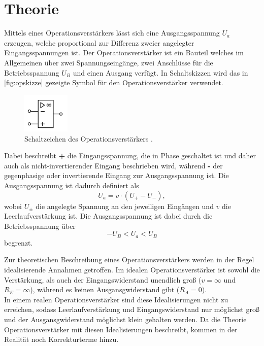 \section{Theorie}
\label{sec:theorie}
Mittels eines Operationsverstärkers lässt sich eine Ausgangsspannung $U_a$ erzeugen, welche 
proportional zur Differenz zweier angelegter Eingangsspannungen ist. 
Der Operationsverstärker ist ein Bauteil welches im Allgemeinen über zwei Spannungseingänge, zwei Anschlüsse 
für die Betriebsspannung $U_B$ und einen Ausgang 
verfügt. In Schaltskizzen wird 
das in \autoref{fig:opskizze} gezeigte Symbol für den Operationsverstärker verwendet.
\begin{figure}[H]
    \centering
    \includegraphics[width=0.2\textwidth]{op.png}
    \caption{Schaltzeichen des Operationsverstärkers \cite{anleitung}.}
    \label{fig:opskizze}
\end{figure}
Dabei beschreibt 
\textbf{+} die Eingangsspannung, die in Phase geschaltet ist und daher auch als nicht-invertierender
Eingang beschrieben wird, während \textbf{-} der gegenphasige oder invertierende Eingang 
zur Ausgangsspannung ist. Die Ausgangsspannung ist dadurch definiert als 
\begin{equation*}
    U_a = v \cdot  (U_+ - U_-),
\end{equation*}
wobei $U_{\pm}$ die angelegte Spannung an den jeweiligen Eingängen und $v$ die Leerlaufverstärkung ist.
Die Ausgangsspannung ist dabei durch die Betriebsspannung über 
\begin{equation*}
    - U_B < U_a < U_B
\end{equation*}
begrenzt.

Zur theoretischen Beschreibung eines Operationsverstärkers werden in der Regel idealisierende 
Annahmen getroffen. Im idealen Operationsverstärker ist sowohl die Verstärkung, als auch 
der Eingangswiderstand unendlich groß ($v = \infty$ und $R_E = \infty$),
während es keinen Ausgansgwiderstand gibt ($R_A = 0$). \\
In einem realen Operationsverstärker sind diese Idealisierungen nicht zu erreichen, sodass 
Leerlaufverstärkung und Eingangswiderstand nur möglichst groß und der Ausgansgwiderstand möglichst 
klein gehalten werden. Da die Theorie Operationsverstärker mit diesen Idealisierungen beschreibt, 
kommen in der Realität noch Korrekturterme hinzu.

